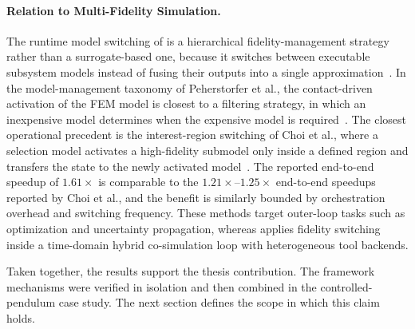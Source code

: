 \paragraph{Relation to Multi-Fidelity Simulation.}
The runtime model switching of \syssimx{} is a hierarchical fidelity-management strategy rather than a surrogate-based one, because it switches between executable subsystem models instead of fusing their outputs into a single approximation~\cite{fernandez-godino_review_2023}.
In the model-management taxonomy of Peherstorfer et al., the contact-driven activation of the \ac{FEM} model is closest to a filtering strategy, in which an inexpensive model determines when the expensive model is required~\cite{peherstorfer_survey_2018}.
The closest operational precedent is the interest-region switching of Choi et al., where a selection model activates a high-fidelity submodel only inside a defined region and transfers the state to the newly activated model~\cite{Choi2014}.
The reported end-to-end speedup of \(1.61\times\) is comparable to the \(1.21\times\)--\(1.25\times\) end-to-end speedups reported by Choi et al., and the benefit is similarly bounded by orchestration overhead and switching frequency.
These methods target outer-loop tasks such as optimization and uncertainty propagation, whereas \syssimx{} applies fidelity switching inside a time-domain hybrid co-simulation loop with heterogeneous tool backends.

Taken together, the results support the thesis contribution.
The framework mechanisms were verified in isolation and then combined in the controlled-pendulum case study.
The next section defines the scope in which this claim holds.
